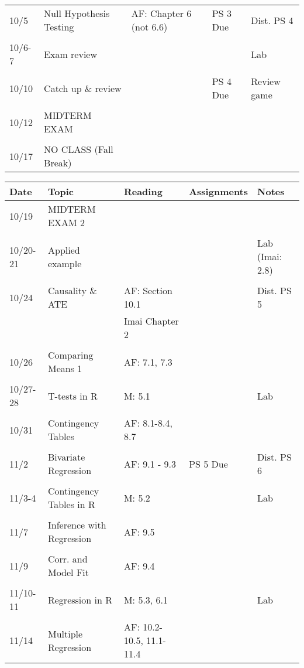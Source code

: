 \documentclass[11pt]{article}
\begin{document}
\begin{small}
\begin{center}
\begin{tabular}{p{1.5cm} p{4cm} p{3.5cm} p{3cm} p{4cm}}
\\
10/5 &  Null Hypothesis Testing  &  AF: Chapter 6 (not 6.6) & PS 3 Due & Dist. PS 4\\
\\
10/6-7 &  Exam review & & &  Lab \\
\\
10/10 & Catch up \& review & & PS 4 Due& Review game \\
\\
10/12 & MIDTERM EXAM  & \\
\\
10/17 & NO CLASS (Fall Break) \\
\bottomrule
\end{tabular}

\begin{tabular}{p{1.5cm} p{4cm} p{3.5cm} p{3cm} p{3cm}}
  \toprule
  Date & Topic & Reading & Assignments & Notes  \\
  \midrule
10/19 & MIDTERM EXAM 2 \\
\\
10/20-21 &  Applied example & & &  Lab (Imai: 2.8)\\
\\
10/24 &  Causality \&   ATE  & AF: Section 10.1 & & Dist. PS 5\\
 & & Imai Chapter 2\\
\\
10/26 & Comparing Means 1  &  AF: 7.1, 7.3 & &  \\
\\
10/27-28 & T-tests in R & M: 5.1& &   Lab \\
\\
 10/31 & Contingency Tables & AF: 8.1-8.4, 8.7 & & \\
\\
 11/2    & Bivariate Regression & AF: 9.1 - 9.3 & PS 5 Due & Dist. PS 6\\
\\
11/3-4 & Contingency Tables in R & M: 5.2& & Lab \\
\\
11/7 & Inference with Regression & AF: 9.5 &  & \\
\\
11/9 &  Corr. and Model Fit & AF: 9.4  & & \\
\\
11/10-11 & Regression in R & M: 5.3, 6.1& & Lab \\
\\
11/14 & Multiple Regression & AF: 10.2-10.5, 11.1-11.4 &  & \\

\end{tabular}
\end{center}
\end{small}
\end{document}
